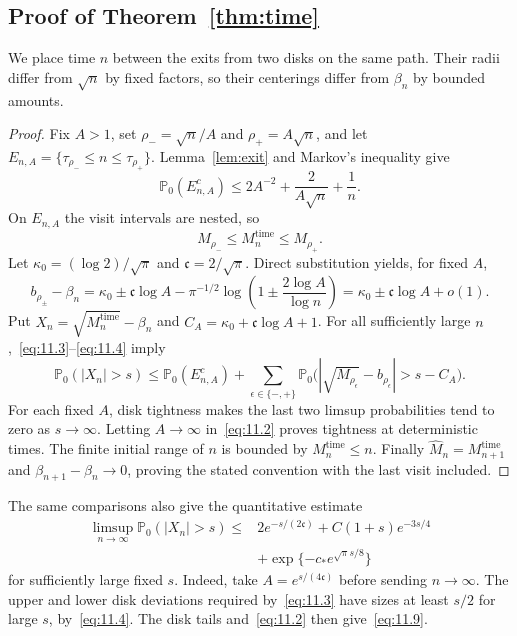 \documentclass[11pt,a4paper]{article}
\numberwithin{equation}{section}
\theoremstyle{remark}
\begin{document}
\subsection{Proof of Theorem~\ref{thm:time}}
We place time $n$ between the exits from two disks on the same path. Their radii differ from $\sqrt n$ by fixed factors, so their centerings differ from $\beta_n$ by bounded amounts.
\begin{proof}
Fix $A>1$, set $\rho_-=\sqrt n/A$ and $\rho_+=A\sqrt n$, and let
$E_{n,A}=\{\tau_{\rho_-}\le n\le\tau_{\rho_+}\}$. Lemma~\ref{lem:exit} and Markov's inequality give
\begin{equation}\label{eq:11.2}
\mathbb P_0(E_{n,A}^c)\le2A^{-2}+\frac{2}{A\sqrt n}+\frac1n.
\end{equation}
On $E_{n,A}$ the visit intervals are nested, so
\begin{equation}\label{eq:11.3}
M_{\rho_-}\le M_n^{\mathrm{time}}\le M_{\rho_+}.
\end{equation}
Let $\kappa_0=(\log2)/\sqrt\pi$ and $\mathfrak c=2/\sqrt\pi$. Direct substitution yields, for fixed $A$,
\begin{equation}\label{eq:11.4}
b_{\rho_\pm}-\beta_n
=\kappa_0\pm\mathfrak c\log A
-\pi^{-1/2}\log\left(1\pm\frac{2\log A}{\log n}\right)
=\kappa_0\pm\mathfrak c\log A+o(1).
\end{equation}
Put $X_n=\sqrt{M_n^{\mathrm{time}}}-\beta_n$ and $C_A=\kappa_0+\mathfrak c\log A+1$. For all sufficiently large $n$,~\eqref{eq:11.3}--\eqref{eq:11.4} imply
\[
\mathbb P_0(|X_n|>s)
\le\mathbb P_0(E_{n,A}^c)
+\sum_{\epsilon\in\{-,+\}}
\mathbb P_0\bigl(|\sqrt{M_{\rho_\epsilon}}-b_{\rho_\epsilon}|>s-C_A\bigr).
\]
For each fixed $A$, disk tightness makes the last two limsup probabilities tend to zero as $s\to\infty$. Letting $A\to\infty$ in~\eqref{eq:11.2} proves tightness at deterministic times. The finite initial range of $n$ is bounded by $M_n^{\mathrm{time}}\le n$. Finally $\widehat M_n=M_{n+1}^{\mathrm{time}}$ and $\beta_{n+1}-\beta_n\to0$, proving the stated convention with the last visit included.
\end{proof}

The same comparisons also give the quantitative estimate
\begin{equation}\label{eq:11.9}
\begin{split}
\limsup_{n\to\infty}\mathbb P_0(|X_n|>s)
\le{}&2e^{-s/(2\mathfrak c)}+C(1+s)e^{-3s/4}\\
&+\exp\{-c_*e^{\sqrt\pi s/8}\}
\end{split}
\end{equation}
for sufficiently large fixed $s$. Indeed, take $A=e^{s/(4\mathfrak c)}$ before sending $n\to\infty$. The upper and lower disk deviations required by~\eqref{eq:11.3} have sizes at least $s/2$ for large $s$, by~\eqref{eq:11.4}. The disk tails and~\eqref{eq:11.2} then give~\eqref{eq:11.9}.
\end{document}
